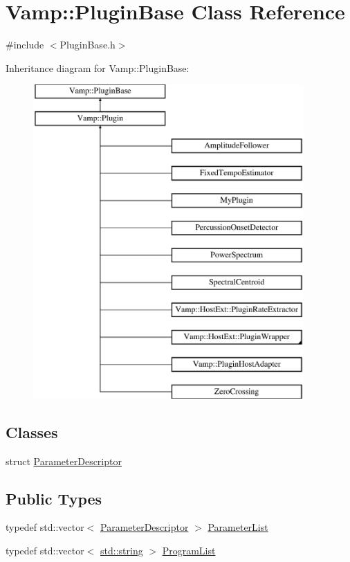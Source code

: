 \hypertarget{class_vamp_1_1_plugin_base}{}\section{Vamp\+:\+:Plugin\+Base Class Reference}
\label{class_vamp_1_1_plugin_base}


{\ttfamily \#include $<$Plugin\+Base.\+h$>$}

Inheritance diagram for Vamp\+:\+:Plugin\+Base\+:\begin{figure}[H]
\begin{center}
\leavevmode
\includegraphics[height=12.000000cm]{class_vamp_1_1_plugin_base}
\end{center}
\end{figure}
\subsection*{Classes}
\begin{DoxyCompactItemize}
\item 
struct \hyperlink{struct_vamp_1_1_plugin_base_1_1_parameter_descriptor}{Parameter\+Descriptor}
\end{DoxyCompactItemize}
\subsection*{Public Types}
\begin{DoxyCompactItemize}
\item 
typedef std\+::vector$<$ \hyperlink{struct_vamp_1_1_plugin_base_1_1_parameter_descriptor}{Parameter\+Descriptor} $>$ \hyperlink{class_vamp_1_1_plugin_base_a3b6bb4bbd86affe1ca9deceea1aad4f8}{Parameter\+List}
\item 
typedef std\+::vector$<$ \hyperlink{test__lib_f_l_a_c_2format_8c_ab02026ad0de9fb6c1b4233deb0a00c75}{std\+::string} $>$ \hyperlink{class_vamp_1_1_plugin_base_a7f66f00437b21e5f694fe02356b12f20}{Program\+List}
\end{DoxyCompactItemize}
